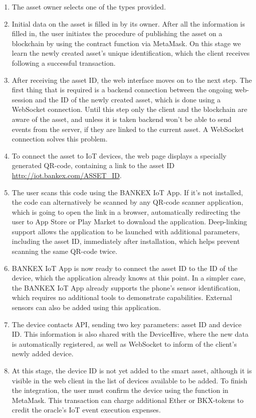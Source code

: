 \documentclass{article}
\begin{document}
\begin{multicols}{2}
\begin{enumerate}
\item The asset owner selects one of the types provided.
\item Initial data on the asset is filled in by its owner. After all the information is filled in, the user initiates the procedure of publishing the asset on a blockchain by using the contract function via MetaMask. On this stage we learn the newly created asset’s unique identification, which the client receives following a successful transaction.
\item After receiving the asset ID, the web interface moves on to the next step. The first thing that is required is a backend connection between the ongoing web-session and the ID of the newly created asset, which is done using a WebSocket connection. Until this step only the client and the blockchain are aware of the asset, and unless it is taken backend won’t be able to send events from the server, if they are linked to the current asset. A WebSocket connection solves this problem.
\item To connect the asset to IoT devices, the web page displays a specially generated QR-code, containing a link to the asset ID \url{http://iot.bankex.com/ASSET_ID}.
\item The user scans this code using the BANKEX IoT App. If it’s not installed, the code can alternatively be scanned by any QR-code scanner application, which is going to open the link in a browser, automatically redirecting the user to App Store or Play Market to download the application. Deep-linking support allows the application to be launched with additional parameters, including the asset ID, immediately after installation, which helps prevent scanning the same QR-code twice.
\item BANKEX IoT App is now ready to connect the asset ID to the ID of the device, which the application already knows at this point. In a simpler case, the BANKEX IoT App already supports the phone’s sensor identification, which requires no additional tools to demonstrate capabilities. External sensors can also be added using this application. 
\item The device contacts API, sending two key parameters: asset ID and device ID. This information is also shared with the DeviceHive, where the new data is automatically registered, as well as WebSocket to inform of the client’s newly added device. 
\item At this stage, the device ID is not yet added to the smart asset, although it is visible in the web client in the list of devices available to be added. To finish the integration, the user must confirm the device using the function in MetaMask. This transaction can charge additional Ether or BKX-tokens to credit the oracle’s IoT event execution expenses.
\end{enumerate}

\end{multicols}
\end{document}
